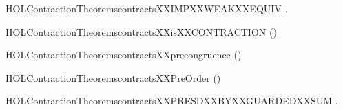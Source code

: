 \newcommand{\HOLContractionTheoremscontractsXXEPSYY}{\UseVerbatim{HOLContractionTheoremscontractsXXEPSYY}}
\begin{SaveVerbatim}{HOLContractionTheoremscontractsXXIMPXXWEAKXXEQUIV}
\HOLTokenTurnstile{} \HOLSymConst{\HOLTokenForall{}} .    \HOLSymConst{\HOLTokenImp{}}   
\end{SaveVerbatim}
\newcommand{\HOLContractionTheoremscontractsXXIMPXXWEAKXXEQUIV}{\UseVerbatim{HOLContractionTheoremscontractsXXIMPXXWEAKXXEQUIV}}
\begin{SaveVerbatim}{HOLContractionTheoremscontractsXXisXXCONTRACTION}
\HOLTokenTurnstile{}  ()
\end{SaveVerbatim}
\newcommand{\HOLContractionTheoremscontractsXXisXXCONTRACTION}{\UseVerbatim{HOLContractionTheoremscontractsXXisXXCONTRACTION}}
\begin{SaveVerbatim}{HOLContractionTheoremscontractsXXprecongruence}
\HOLTokenTurnstile{}  ()
\end{SaveVerbatim}
\newcommand{\HOLContractionTheoremscontractsXXprecongruence}{\UseVerbatim{HOLContractionTheoremscontractsXXprecongruence}}
\begin{SaveVerbatim}{HOLContractionTheoremscontractsXXPreOrder}
\HOLTokenTurnstile{}  ()
\end{SaveVerbatim}
\newcommand{\HOLContractionTheoremscontractsXXPreOrder}{\UseVerbatim{HOLContractionTheoremscontractsXXPreOrder}}
\begin{SaveVerbatim}{HOLContractionTheoremscontractsXXPRESDXXBYXXGUARDEDXXSUM}
\HOLTokenTurnstile{} \HOLSymConst{\HOLTokenForall{}}     .
          \HOLSymConst{\HOLTokenConj{}}    \HOLSymConst{\HOLTokenImp{}}
        \HOLSymConst{\ensuremath{+}}    \HOLSymConst{\ensuremath{+}} 
\end{SaveVerbatim}
